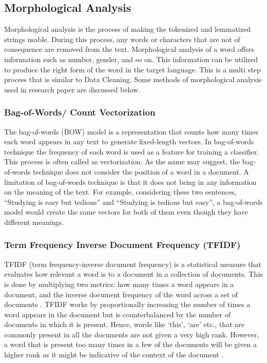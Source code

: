 \documentclass{article}
\begin{document}


\subsection{Morphological Analysis}
Morphological analysis is the process of making the tokenized and lemmatized strings usable. During this process, any words or characters that are not of consequence are removed from the text. Morphological analysis of a word offers information such as number, gender, and so on. This information can be utilized to produce the right form of the word in the target language. This is a multi step process that is similar to Data Cleaning. Some methods of morphological analysis used in research paper are discussed below.

\subsubsection{Bag-of-Words/ Count Vectorization}
The bag-of-words (BOW) model is a representation that counts how many times each word appears in any text to generate fixed-length vectors. In bag-of-words technique the frequency of each word is used as a feature for training a classifier. This process is often called as vectorization. As the name may suggest, the bag-of-words technique does not consider the position of a word in a document. A limitation of bag-of-words technique is that it does not bring in any information on the meaning of the text. For example, considering these two sentences, ``Studying is easy but tedious” and ``Studying is tedious but easy”, a bag-of-words model would create the same vectors for both of them even though they have different meanings.


\subsubsection{Term Frequency Inverse Document Frequency (TFIDF)}

TFIDF (term frequency-inverse document frequency) is a statistical measure that evaluates how relevant a word is to a document in a collection of documents. This is done by multiplying two metrics: how many times a word appears in a document, and the inverse document frequency of the word across a set of documents \cite{10}. TFIDF works by proportionally increasing the number of times a word appears in the document but is counterbalanced by the number of documents in which it is present. Hence, words like `this’,   `are’ etc., that are commonly present in all the documents are not given a very high rank. However, a word that is present too many times in a few of the documents will be given a higher rank as it might be indicative of the context of the document \cite{11}.
\end{document}

